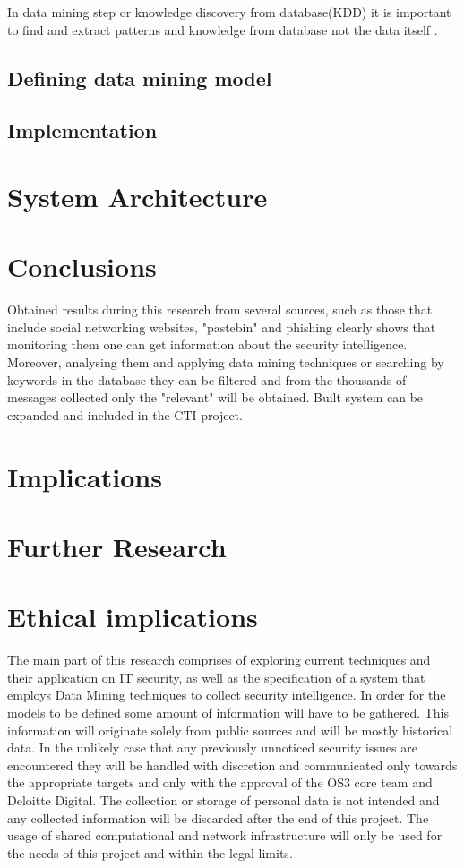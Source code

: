 \documentclass[12pt]{article}
\begin{document}
In data mining step or knowledge discovery from database(KDD) it is important to find and extract patterns and knowledge from database not the data itself \cite{data-kdd}.  
 
\subsection{Defining data mining model}
\subsection{Implementation}

\newpage
\section{System Architecture}
\newpage
\section*{Conclusions}
Obtained results during this research from several sources, such as those that include social networking websites, "pastebin" and phishing clearly shows that monitoring them one can get information about the security intelligence. Moreover, analysing them and applying data mining techniques or searching by keywords in the database they can be filtered and from the thousands of messages collected only the "relevant" will be obtained. Built system can be expanded and included in the CTI project.
\newpage
\section*{Implications}
\newpage
\section*{Further Research}
\newpage
\section*{Ethical implications}
The main part of this research comprises of exploring current techniques and their application on IT security, as well as the specification of a system that employs Data Mining techniques to collect security intelligence. In order for the models to be defined some amount of information will have to be gathered. This information will originate solely from public sources and will be mostly historical data. In the unlikely case that any previously unnoticed security issues are encountered they will be handled with discretion and communicated only towards the appropriate targets and only with the approval of the OS3 core team and Deloitte Digital. The collection or storage of personal data is not intended and any collected information will be discarded after the end of this project. The usage of shared computational and network infrastructure will only be used for the needs of this project and within the legal limits.
\newpage
\end{document}
